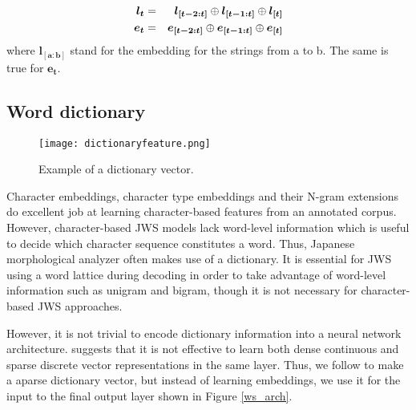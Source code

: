 \documentclass[11pt,letterpaper]{article}
\begin{document}
\begin{eqnarray}
\bm{l_{t}} &=& \bm{l_{[t-2:t]}} \oplus \bm{l_{[t-1:t]}} \oplus \bm{l_{[t]}} \\
\bm{e_{t}} &=& \bm{e_{[t-2:t]}} \oplus \bm{e_{[t-1:t]}} \oplus \bm{e_{[t]}} 
\vspace{6pt}
\end{eqnarray}
where $\bm{l_{[a:b]}}$ stand for the embedding for the strings from a to b. The same is true for $\bm{e_t}$.


\subsection{Word dictionary}


\begin{figure*}[t]    
 \begin{center}    
 \texttt{[image: dictionaryfeature.png]}              
 \caption{Example of a dictionary vector.}    
 \label{dictionaryfeature}    
\end{center}    
\end{figure*}

Character embeddings, character type embeddings and their N-gram extensions do excellent job at learning character-based features from an annotated corpus. However, character-based JWS models lack word-level information which is useful to decide which character sequence constitutes a word.
Thus, Japanese morphological analyzer often makes use of a dictionary.
It is essential for JWS using a word lattice during decoding in order to take advantage of word-level information such as unigram and bigram, though it is not necessary for character-based JWS approaches.

However, it is not trivial to encode dictionary information into a neural network architecture.
{} suggests that it is not effective to learn both dense continuous and sparse discrete vector representations in the same layer. 
Thus, we follow   to make a aparse dictionary vector, but instead of learning embeddings, we use it for the input to the final output layer shown in Figure \ref{ws_arch}.
\end{document}
